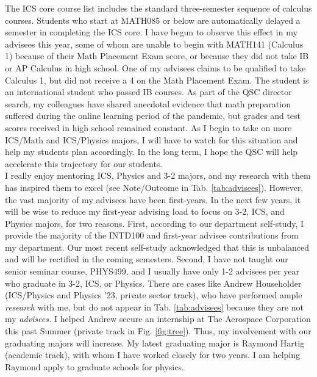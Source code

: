 \documentclass[../../main.tex]{subfiles}
\begin{document}
The ICS core course list includes the standard three-semester sequence of calculus courses.  Students who start at MATH085 or below are automatically delayed a semester in completing the ICS core.  I have begun to observe this effect in my advisees this year, some of whom are unable to begin with MATH141 (Calculus 1) because of their Math Placement Exam score, or because they did not take IB or AP Calculus in high school.  One of my advisees claims to be qualified to take Calculus 1, but did not receive a 4 on the Math Placement Exam.  The student is an international student who passed IB courses.  As part of the QSC director search, my colleagues have shared anecdotal evidence that math preparation suffered during the online learning period of the pandemic, but grades and test scores received in high school remained constant.  As I begin to take on more ICS/Math and ICS/Physics majors, I will have to watch for this situation and help my students plan accordingly.  In the long term, I hope the QSC will help accelerate this trajectory for our students.
\\
\vspace{0.15cm}
I really enjoy mentoring ICS, Physics and 3-2 majors, and my research with them has inspired them to excel (see Note/Outcome in Tab. \ref{tab:advisees}).  However, the vast majority of my advisees have been first-years.  In the next few years, it will be wise to reduce my first-year advising load to focus on 3-2, ICS, and Physics majors, for two reasons.  First, according to our department self-study, I provide the majority of the INTD100 and first-year advisee contributions from my department.  Our most recent self-study acknowledged that this is unbalanced and will be rectified in the coming semesters.  Second, I have not taught our senior seminar course, PHYS499, and I usually have only 1-2 advisees per year who graduate in 3-2, ICS, or Physics.  There are cases like Andrew Householder (ICS/Physics and Physics '23, private sector track), who have performed ample \textit{research} with me, but do not appear in Tab. \ref{tab:advisees} because they are not my \textit{advisees.}  I helped Andrew secure an internship at The Aerospace Corporation this past Summer (private track in Fig. \ref{fig:tree}).  Thus, my involvement with our graduating majors will increase.  My latest graduating major is Raymond Hartig (academic track), with whom I have worked closely for two years.  I am helping Raymond apply to graduate schools for physics.
\\
\vspace{0.15cm}
\end{document}
